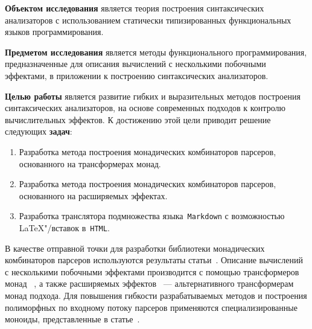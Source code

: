 \textbf{Объектом исследования} является теория построения синтаксических анализаторов 
с использованием статически типизированных функциональных языков программирования.  

\textbf{Предметом исследования} является методы функционального программирования, 
предназначенные для описания вычислений с несколькими побочными эффектами, 
в приложении к построению синтаксических анализаторов.  

\textbf{Целью работы} является развитие гибких и выразительных методов построения 
синтаксических анализаторов, на основе современных подходов к контролю вычислительных
эффектов.
К достижению этой цели приводит решение следующих \textbf{задач}:
\begin{enumerate}
  \item Разработка метода построения монадических комбинаторов парсеров, 
  основанного на трансформерах монад.
  \item Разработка метода построения монадических комбинаторов парсеров, 
  основанного на расширяемых эффектах.
  \item Разработка транслятора подмножества языка~\lstinline{Markdown} с возможностью
  \LaTeX"/вставок в~\lstinline{HTML}.
\end{enumerate}  

В качестве отправной точки для разработки библиотеки монадических комбинаторов
парсеров используются результаты статьи~\cite{monParsing}. Описание вычислений
с несколькими побочными эффектами производится с помощью трансформеров монад
~\cite{monadTransformers}, а также расширяемых эффектов~\cite{extEffects} ---
альтернативного трансформерам монад подхода. Для повышения гибкости разрабатываемых 
методов и построения полиморфных по входному потоку парсеров применяются 
специализированные моноиды, представленные в статье~\cite{monoids}.
